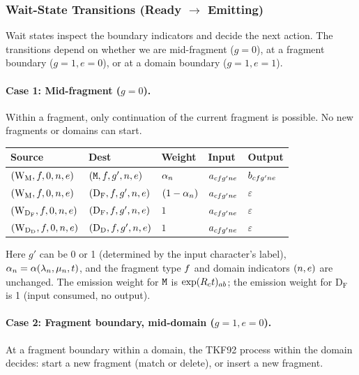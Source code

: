 \subsubsection{\texorpdfstring{Wait-State Transitions (Ready $\to$ Emitting)}{Wait-State Transitions (Ready -> Emitting)}}
\label{sec:wait-transitions}

Wait states inspect the boundary indicators and decide the next action.
The transitions depend on whether we are mid-fragment ($g=0$),
at a fragment boundary ($g=1, e=0$), or at a domain boundary ($g=1, e=1$).

\paragraph{Case 1: Mid-fragment ($g = 0$).}
Within a fragment, only continuation of the current fragment is possible.
No new fragments or domains can start.

\begin{center}
\renewcommand{\arraystretch}{1.5}
\begin{tabular}{lllll}
\hline
Source & Dest & Weight & Input & Output \\
\hline
$(\mathrm{W_M}, f, 0, n, e)$ &
  $({\tt M}, f, g', n, e)$ &
  $\alpha_n$ &
  $a_{cf g'n e}$ &
  $b_{cf g'n e}$ \\
$(\mathrm{W_M}, f, 0, n, e)$ &
  $(\mathrm{D_F}, f, g', n, e)$ &
  $(1-\alpha_n)$ &
  $a_{cf g'n e}$ &
  $\varepsilon$ \\
\hline
$(\mathrm{W_{D_F}}, f, 0, n, e)$ &
  $(\mathrm{D_F}, f, g', n, e)$ &
  $1$ &
  $a_{cf g'n e}$ &
  $\varepsilon$ \\
\hline
$(\mathrm{W_{D_D}}, f, 0, n, e)$ &
  $(\mathrm{D_D}, f, g', n, e)$ &
  $1$ &
  $a_{cf g'n e}$ &
  $\varepsilon$ \\
\hline
\end{tabular}
\end{center}
Here $g'$ can be 0 or 1 (determined by the input character's label),
$\alpha_n = \alpha(\lambda_n, \mu_n, t)$,
and the fragment type $f$ and domain indicators $(n, e)$ are unchanged.
The emission weight for ${\tt M}$ is $\exp(R_c t)_{ab}$;
the emission weight for $\mathrm{D_F}$ is 1 (input consumed, no output).

\paragraph{Case 2: Fragment boundary, mid-domain ($g = 1, e = 0$).}
At a fragment boundary within a domain, the TKF92 process within the domain
decides: start a new fragment (match or delete), or insert a new fragment.

